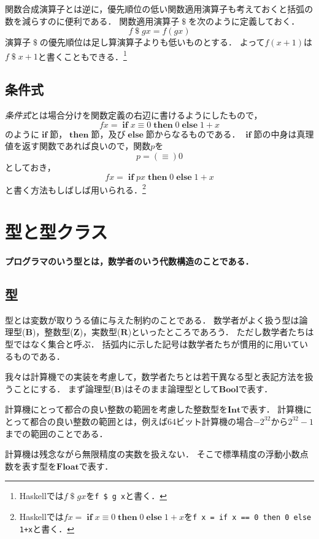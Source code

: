 \documentclass[twocolumn]{jsbook}
\newcommand{\keyword}[1]{\emph{#1}}
\newcommand{\code}[1]{\texttt{#1}}
\newenvironment{leader}{\begingroup\bf}{\endgroup}
\newcommand{\typename}[1]{\mathbf{#1}}
\newcommand{\typebool}{\typename{Bool}}
\newcommand{\typeint}{\typename{Int}}
\newcommand{\typefloat}{\typename{Float}}
\newcommand{\binaryeq}{\equiv}
\newcommand{\binaryapply}{\mathop{\$}}
\newcommand{\keywordname}[1]{\mathbf{#1}}
\newcommand{\keywordif}{\mathop{\keywordname{if}}}
\newcommand{\keywordthen}{\mathop{\keywordname{then}}}
\newcommand{\keywordelse}{\mathop{\keywordname{else}}}
\newcommand{\mathsetname}[1]{\boldsymbol{#1}}
\begin{document}
関数合成演算子とは逆に，優先順位の低い関数適用演算子も考えておくと括弧の数を減らすのに便利である．
関数適用演算子$\binaryapply$を次のように定義しておく．
$$f\binaryapply gx=f(gx)$$
演算子$\binaryapply$の優先順位は足し算演算子よりも低いものとする．
よって$f(x+1)$は$f\binaryapply x+1$と書くこともできる．\footnote{Haskellでは$f\binaryapply gx$を\code{f \$ g x}と書く．}

\section{条件式}

\keyword{条件式}とは場合分けを関数定義の右辺に書けるようにしたもので，
$$fx=\keywordif x\binaryeq0\keywordthen0\keywordelse1+x$$
のように$\keywordif$節，$\keywordthen$節，及び$\keywordelse$節からなるものである．
$\keywordif$節の中身は真理値を返す関数であれば良いので，関数$p$を$$p=(\equiv)0$$としておき，$$fx=\keywordif px\keywordthen0\keywordelse 1+x$$と書く方法もしばしば用いられる．\footnote{Haskellでは$fx=\keywordif x\binaryeq0\keywordthen0\keywordelse1+x$を\code{f x = if x == 0 then 0 else 1+x}と書く．}

\chapter{型と型クラス}

\begin{leader}
プログラマのいう型とは，数学者のいう代数構造のことである．
\end{leader}


\section{型}

型とは変数が取りうる値に与えた制約のことである．
数学者がよく扱う型は論理型($\mathsetname{B}$)，整数型($\mathsetname{Z}$)，実数型($\mathsetname{R}$)といったところであろう．
ただし数学者たちは型ではなく集合と呼ぶ．
括弧内に示した記号は数学者たちが慣用的に用いているものである．

我々は計算機での実装を考慮して，数学者たちとは若干異なる型と表記方法を扱うことにする．
まず論理型($\mathsetname{B}$)はそのまま論理型として$\typebool$で表す．

計算機にとって都合の良い整数の範囲を考慮した整数型を$\typeint$で表す．
計算機にとって都合の良い整数の範囲とは，例えば64ビット計算機の場合$-2^{32}$から$2^{32}-1$までの範囲のことである．

計算機は残念ながら無限精度の実数を扱えない．
そこで標準精度の浮動小数点数を表す型を$\typefloat$で表す．
\end{document}
